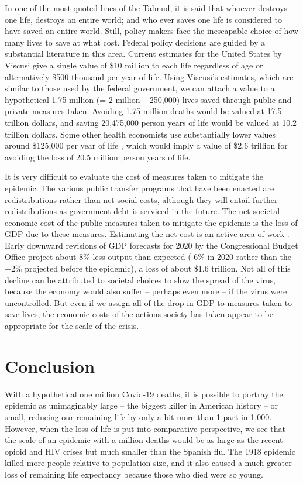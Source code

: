 \documentclass[9pt,twocolumn,twoside,lineno]{pnas-new}
\begin{document}
In one of the most quoted lines of the Talmud, it is said that whoever
destroys one life, destroys an entire world; and who ever saves one
life is considered to have saved an entire world. Still, policy makers
face the inescapable choice of how many lives to save at what
cost. Federal policy decisions are guided by a substantial literature
in this area. Current estimates for the United States by Viscusi
\cite{viscusi:2018,viscusi:2020} give a single value of \$10 million
to each life regardless of age or alternatively \$500 thousand per
year of life. Using Viscusi’s estimates, which are similar to those
used by the federal government, we can attach a value to a
hypothetical 1.75 million (= 2 million – 250,000) lives saved through
public and private measures taken. Avoiding 1.75 million deaths would
be valued at 17.5 trillion dollars, and saving 20,475,000 person years
of life would be valued at 10.2 trillion dollars. Some other health
economists use substantially lower values around \$125,000 per year of
life \cite{ICER:2020}, which would imply a value of \$2.6 trillion for
avoiding the loss of 20.5 million person years of life.

It is very difficult to evaluate the cost of measures taken to
mitigate the epidemic. The various public transfer programs that have
been enacted are redistributions rather than net social costs,
although they will entail further redistributions as government debt
is serviced in the future. The net societal economic cost of the
public measures taken to mitigate the epidemic is the loss of GDP due
to these measures. Estimating the net cost is an active area of work
\cite{correia:2020,eichenbaum:2020}. Early downward revisions of GDP
forecasts for 2020 by the Congressional Budget Office \cite{cbo:2020}
project about 8\%  less output
than expected (-6\% in 2020 rather than the +2\% projected before
the epidemic), a loss of about \$1.6 trillion. Not all of this decline can be
attributed to societal choices to slow the spread of the virus,
because the economy would also suffer -- perhaps even more -- if the
virus were uncontrolled. But even if we assign all of the drop in GDP
to measures taken to save lives, the economic costs of the actions
society has taken appear to be appropriate for the scale of the
crisis.

\section*{Conclusion}

With a hypothetical one million Covid-19 deaths, it is possible to
portray the epidemic as unimaginably large -- the biggest killer in
American history -- or small, reducing our remaining life
by only a bit more than 1 part in 1,000. However, when the loss of
life is put into comparative perspective, we see that the scale of an
epidemic with a million deaths would be as large as the recent opioid
and HIV crises but much smaller than the Spanish flu. The 1918
epidemic killed more people relative to population size, and it also
caused a much greater loss of remaining life expectancy because those
who died were so young.
\end{document}
